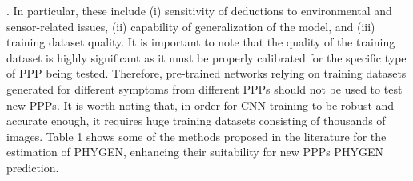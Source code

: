 \documentclass[12pt,a4paper,oneside]{report}
\begin{document}
\cite{barbedoDeepLearningApplied2022,barbedoFactorsInfluencingUse2018}.
In particular, these include (i) sensitivity of deductions to environmental and sensor-related issues, (ii) capability of generalization of the model, and (iii) training dataset quality. It is important to note that the quality of the training dataset is highly significant as it must be properly calibrated for the specific type of PPP being tested. Therefore, pre-trained networks relying on training datasets generated for different symptoms from different PPPs should not be used to test new PPPs. It is worth noting that, in order for CNN training to be robust and accurate enough, it requires huge training datasets consisting of thousands of images. Table 1 shows some of the methods proposed in the literature for the estimation of PHYGEN, enhancing their suitability for new PPPs PHYGEN prediction.
\end{document}
